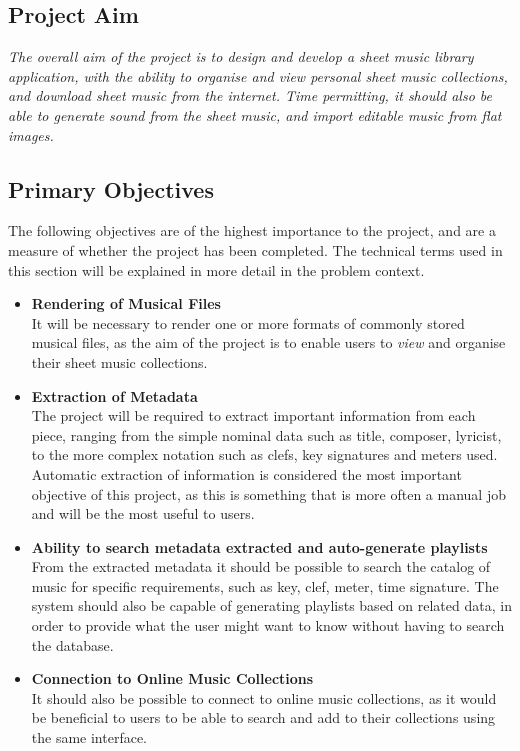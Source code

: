 \subsection{Project Aim}
\begin{center}
\textit{The overall aim of the project is to design and develop a sheet music library application, with the ability to organise and view personal sheet music collections, and download sheet music from the internet. Time permitting, it should also be able to generate sound from the sheet music, and import editable music from flat images.}
\end{center}
\subsection{Primary Objectives}
The following objectives are of the highest importance to the project, and are a measure of whether the project has been completed. The technical terms used in this section will be explained in more detail in the problem context.
\begin{itemize}
	\item \textbf{Rendering of Musical Files}\\
    It will be necessary to render one or more formats of commonly stored musical files, as the aim of the project is to enable users to \textit{view} and organise their sheet music collections. 
    \item \textbf{Extraction of Metadata}\\
    The project will be required to extract important information from each piece, ranging from the simple nominal data such as title, composer, lyricist, to the more complex notation such as clefs, key signatures and meters used. Automatic extraction of information is considered the most important objective of this project, as this is something that is more often a manual job and will be the most useful to users. 
    \item \textbf{Ability to search metadata extracted and auto-generate playlists}\\ From the extracted metadata it should be possible to search the catalog of music for specific requirements, such as key, clef, meter, time signature. The system should also be capable of generating playlists based on related data, in order to provide what the user might want to know without having to search the database.
    \item \textbf{Connection to Online Music Collections}\\
    It should also be possible to connect to online music collections, as it would be beneficial to users to be able to search and add to their collections using the same interface.

\end{itemize}
